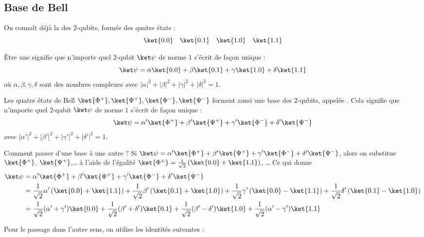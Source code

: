 \documentclass[11pt,class=report,crop=false]{standalone}
\begin{document}
\subsection{Base de Bell}

On connaît déjà la  des $2$-qubits, formée des quatre états :
$$\ket{0.0}\quad\ket{0.1}\quad\ket{1.0}\quad\ket{1.1}$$

Être une  signifie que n'importe quel $2$-qubit $\ket\psi$ de norme $1$ s'écrit de façon unique :
$$\ket\psi = \alpha\ket{0.0} + \beta\ket{0.1} + \gamma\ket{1.0} + \delta\ket{1.1}$$
où $\alpha,\beta,\gamma,\delta$ sont des nombres complexes avec $|\alpha|^2 + |\beta|^2 + |\gamma|^2 + |\delta|^2 = 1$.

\begin{proposition}
Les quatre états de Bell $\ket{\Phi^+}, 
\ket{\Psi^+},
\ket{\Phi^-},
\ket{\Psi^-}$
forment aussi une base des $2$-qubits, appelée .
Cela signifie que n'importe quel $2$-qubit $\ket\psi$ de norme $1$ s'écrit de façon unique :
$$\ket\psi = \alpha'\ket{\Phi^+} + \beta'\ket{\Psi^+} + \gamma'\ket{\Phi^-} + \delta'\ket{\Psi^-}$$
avec $|\alpha'|^2 + |\beta'|^2 + |\gamma'|^2 + |\delta'|^2 = 1$.
\end{proposition}

\bigskip

Comment passer d'une base à une autre ?
Si $\ket\psi = \alpha'\ket{\Phi^+} + \beta'\ket{\Psi^+} + \gamma'\ket{\Phi^-} + \delta'\ket{\Psi^-}$,
alors on substitue $\ket{\Phi^+}$, $\ket{\Psi^+}$,\ldots{} à l'aide de l'égalité $\ket{\Phi^+} = \frac1{\sqrt2}\left(\ket{0.0}+\ket{1.1}\right)$, \ldots{}
Ce qui donne 
\begin{align*}
\ket\psi 
&= \alpha'\ket{\Phi^+} + \beta'\ket{\Psi^+} + \gamma'\ket{\Phi^-} + \delta'\ket{\Psi^-} \\
&= \frac1{\sqrt2}\alpha'\left(\ket{0.0}+\ket{1.1}\right) 
+ \frac1{\sqrt2}\beta'\left(\ket{0.1}+\ket{1.0}\right) 
+ \frac1{\sqrt2}\gamma'\left(\ket{0.0}-\ket{1.1}\right) 
+ \frac1{\sqrt2}\delta'\left(\ket{0.1}-\ket{1.0}\right) \\
&= \frac1{\sqrt2}(\alpha'+\gamma')\ket{0.0}
+ \frac1{\sqrt2}(\beta'+\delta')\ket{0.1}
+ \frac1{\sqrt2}(\beta'-\delta')\ket{1.0}
+ \frac1{\sqrt2}(\alpha'-\gamma')\ket{1.1} \\
\end{align*}

Pour le passage dans l'autre sens, on utilise les identités suivantes :
\end{document}
